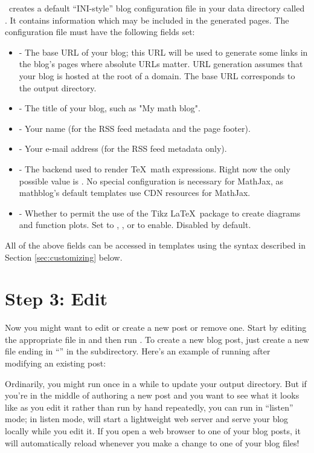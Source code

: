 \documentclass[11pt, letterpaper, oneside, titlepage]{book}
\begin{document}
\mathblog\ creates a default ``INI-style'' blog configuration file in
your data directory called .  It contains information
which may be included in the generated pages.  The configuration file
must have the following fields set:

\begin{itemize}
\item{ - The base URL of your blog; this URL will be used
  to generate some links in the blog's pages where absolute URLs
  matter.  URL generation assumes that your blog is hosted at the root
  of a domain.  The base URL corresponds to the output directory.}
\item{ - The title of your blog, such as "My math blog".}
\item{ - Your name (for the RSS feed metadata and the
  page footer).}
\item{ - Your e-mail address (for the RSS feed
  metadata only).}
\item{ - The backend used to render \TeX\ math
  expressions.  Right now the only possible value is .  No
  special configuration is necessary for MathJax, as mathblog's
  default templates use CDN resources for MathJax.}
\item{ - Whether to permit the use of the Tikz
  \LaTeX\ package to create diagrams and function plots.  Set to
  , , or  to enable.  Disabled by default.}
\end{itemize}

All of the above fields can be accessed in templates using the syntax
described in Section \ref{sec:customizing} below.

\section{Step 3: Edit}

Now you might want to edit or create a new post or remove one.  Start
by editing the appropriate file in  and then run .
To create a new blog post, just create a new file ending in
``'' in the  subdirectory.  Here's an example of
running  after modifying an existing post:


Ordinarily, you might run  once in a while to update your
output directory.  But if you're in the middle of authoring a new post
and you want to see what it looks like as you edit it rather than run
 by hand repeatedly, you can run  in ``listen'' mode; in
listen mode,  will start a lightweight web server and serve
your blog locally while you edit it.  If you open a web browser to one
of your blog posts, it will automatically reload whenever you make a
change to one of your blog files!
\end{document}
